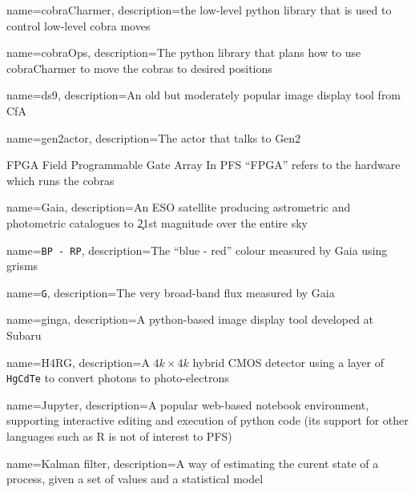%
%
%
%
%
{
  name={cobraCharmer},
  description={the low-level python library that is used to control low-level cobra moves}
}

{
  name={cobraOps},
  description={The python library that plans how to use \gls{cobraCharmer} to move
  the cobras to desired positions}
}

{
  name={ds9},
  description={An old but moderately popular image display tool from CfA}
}

{
  name={gen2actor},
  description={The \MHS actor that talks to \gls{Gen2}}
}

{FPGA}
{Field Programmable Gate Array}
{In PFS ``FPGA'' refers to the hardware which runs the cobras}


{
  name={Gaia},
  description={An ESO satellite producing astrometric and photometric catalogues to \c 21st
  magnitude over the entire sky}
}

{
  name={\texttt{BP - RP}},
  description={The ``blue - red'' colour measured by \gls{Gaia} using grisms}
}

{
  name={\texttt{G}},
  description={The very broad-band flux measured by \gls{Gaia}}
}

{
  name={ginga},
  description={A python-based image display tool developed at Subaru}
}

{
   name={H4RG},
   description={A $4k\times 4k$ hybrid CMOS detector using a layer of \texttt{HgCdTe} to convert photons
   to photo-electrons}
}

{
  name={Jupyter},
  description={A popular web-based notebook environment, supporting interactive editing
    and execution of python code (its support for other languages such as R is not of interest to PFS)}
}

{
   name={Kalman filter},
   description={A way of estimating the curent state of a process, given a set of values and
   a statistical model}
}

